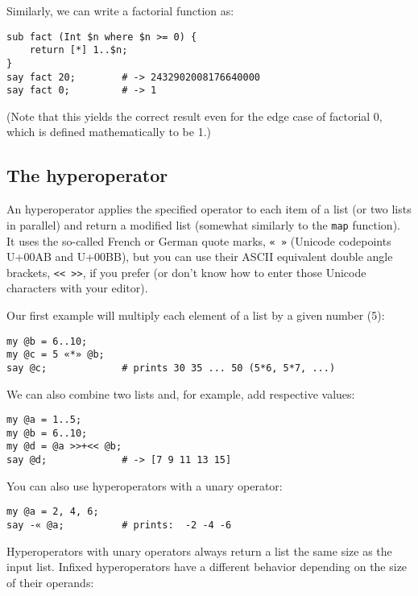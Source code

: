 Similarly, we can write a factorial function as:

\begin{verbatim}
sub fact (Int $n where $n >= 0) {
    return [*] 1..$n;
}
say fact 20;        # -> 2432902008176640000
say fact 0;         # -> 1
\end{verbatim}

(Note that this yields the correct result even for the 
edge case of factorial 0, which is defined mathematically 
to be 1.)

\subsection{The hyperoperator}

An hyperoperator applies the specified operator to each 
item of a list (or two lists in parallel) and return a 
modified list (somewhat similarly to the {\tt map} 
function). It uses the so-called French or German 
quote marks, \verb'« »' (Unicode codepoints U+00AB 
and U+00BB), but you can use their ASCII equivalent 
double angle brackets, \verb'<< >>', if you prefer 
(or don't know how to enter those Unicode characters 
with your editor).

Our first example will multiply each element of a list 
by a given number (5):

\begin{verbatim}
my @b = 6..10;
my @c = 5 «*» @b;
say @c;             # prints 30 35 ... 50 (5*6, 5*7, ...)
\end{verbatim}

We can also combine two lists and, for example, add 
respective values:

\begin{verbatim}
my @a = 1..5;
my @b = 6..10;
my @d = @a >>+<< @b;
say @d;             # -> [7 9 11 13 15]
\end{verbatim}

You can also use hyperoperators with a unary operator:

\begin{verbatim}
my @a = 2, 4, 6;
say -« @a;          # prints:  -2 -4 -6
\end{verbatim}

Hyperoperators with unary operators always return a 
list the same size as the input list. Infixed 
hyperoperators have a different behavior depending on 
the size of their operands:

